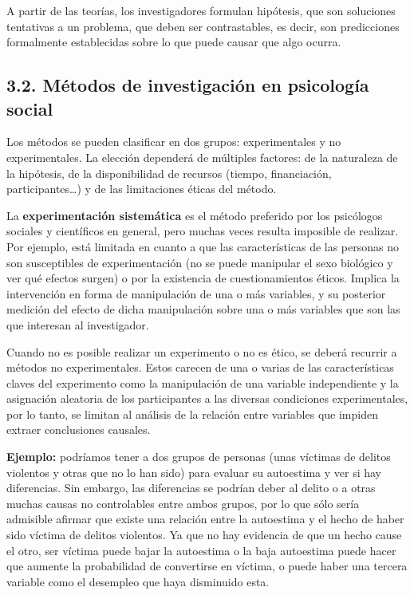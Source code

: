 \documentclass[
]{website}
\begin{document}
A partir de las teorías, los investigadores formulan hipótesis, que son soluciones tentativas a un problema, que deben ser contrastables, es decir, son predicciones formalmente establecidas sobre lo que puede causar que algo ocurra.

\subsection*{3.2. Métodos de investigación en psicología social}\label{subtema3_2}

Los métodos se pueden clasificar en dos grupos: experimentales y no experimentales. La elección dependerá de múltiples factores: de la naturaleza de la hipótesis, de la disponibilidad de recursos (tiempo, financiación, participantes\ldots) y de las limitaciones éticas del método.

La \textbf{experimentación sistemática} es el método preferido por los psicólogos sociales y científicos en general, pero muchas veces resulta imposible de realizar. Por ejemplo, está limitada en cuanto a que las características de las personas no son susceptibles de experimentación (no se puede manipular el sexo biológico y ver qué efectos surgen) o por la existencia de cuestionamientos éticos. Implica la intervención en forma de manipulación de una o más variables, y su posterior medición del efecto de dicha manipulación sobre una o más variables que son las que interesan al investigador.

Cuando no es posible realizar un experimento o no es ético, se deberá recurrir a métodos no experimentales. Estos carecen de una o varias de las características claves del experimento como la manipulación de una variable independiente y la asignación aleatoria de los participantes a las diversas condiciones experimentales, por lo tanto, se limitan al análisis de la relación entre variables que impiden extraer conclusiones causales.

\textbf{Ejemplo:} podríamos tener a dos grupos de personas (unas víctimas de delitos violentos y otras que no lo han sido) para evaluar su autoestima y ver si hay diferencias. Sin embargo, las diferencias se podrían deber al delito o a otras muchas causas no controlables entre ambos grupos, por lo que sólo sería admisible afirmar que existe una relación entre la autoestima y el hecho de haber sido víctima de delitos violentos. Ya que no hay evidencia de que un hecho cause el otro, ser víctima puede bajar la autoestima o la baja autoestima puede hacer que aumente la probabilidad de convertirse en víctima, o puede haber una tercera variable como el desempleo que haya disminuido esta.
\end{document}
